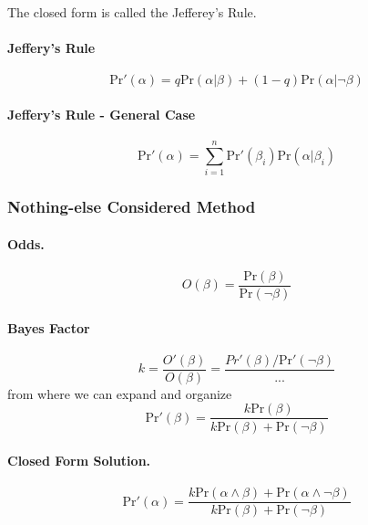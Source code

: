 \documentclass[11pt]{article}
\newcommand{\pr}{\mathrm{Pr}}
\begin{document}
The closed form is called the Jefferey's Rule. 

\paragraph{Jeffery's Rule}
\begin{equation}
	\pr ' (\alpha) = q \pr ( \alpha | \beta ) + (1 - q) \pr ( \alpha | \neg \beta)
\end{equation}

\paragraph{Jeffery's Rule - General Case}
\begin{equation}
	\pr'(\alpha) = \sum_{i = 1}^n\pr ' (\beta_i) \pr( \alpha | \beta_i) 
\end{equation}

\subsubsection{Nothing-else Considered Method}
\paragraph{Odds. } 
\begin{equation}
	O(\beta) = \frac{\pr( \beta)}{\pr ( \neg \beta)}
\end{equation}

\paragraph{Bayes Factor} 
\begin{equation}
	k = \frac{O'(\beta)}{O ( \beta)} = \frac{Pr'(\beta) / \pr'(\neg \beta)}{...}
\end{equation}
from where we can expand and organize
\begin{equation}
	\pr' ( \beta) = \frac{k \pr ( \beta) }{k \pr ( \beta) + \pr ( \neg \beta) } 
\end{equation}

\paragraph{Closed Form Solution.}
\begin{equation}
	\pr' (\alpha) = \frac{k\pr ( \alpha \land \beta) + \pr (\alpha \land \neg \beta)}{k \pr ( \beta ) + \pr ( \neg \beta)}
\end{equation}
\end{document}
